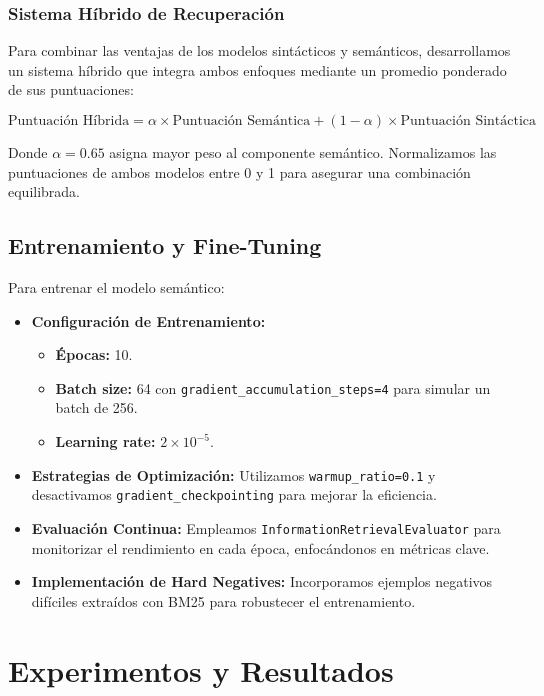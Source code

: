 \documentclass[11pt,english]{article}
\theoremstyle{plain}
\begin{document}
\subsubsection{Sistema Híbrido de Recuperación}

Para combinar las ventajas de los modelos sintácticos y semánticos, desarrollamos un sistema híbrido que integra ambos enfoques mediante un promedio ponderado de sus puntuaciones:

\[
\text{Puntuación Híbrida} = \alpha \times \text{Puntuación Semántica} + (1 - \alpha) \times \text{Puntuación Sintáctica}
\]

\noindent Donde $\alpha = 0.65$ asigna mayor peso al componente semántico. Normalizamos las puntuaciones de ambos modelos entre 0 y 1 para asegurar una combinación equilibrada.

\subsection{Entrenamiento y Fine-Tuning}

Para entrenar el modelo semántico:

\begin{itemize}
    \item \textbf{Configuración de Entrenamiento:}
    \begin{itemize}
        \item \textbf{Épocas:} 10.
        \item \textbf{Batch size:} 64 con \texttt{gradient\_accumulation\_steps=4} para simular un batch de 256.
        \item \textbf{Learning rate:} $2 \times 10^{-5}$.
    \end{itemize}

    \item \textbf{Estrategias de Optimización:} Utilizamos \texttt{warmup\_ratio=0.1} y desactivamos \texttt{gradient\_checkpointing} para mejorar la eficiencia.

    \item \textbf{Evaluación Continua:} Empleamos \texttt{InformationRetrievalEvaluator} para monitorizar el rendimiento en cada época, enfocándonos en métricas clave.

    \item \textbf{Implementación de Hard Negatives:} Incorporamos ejemplos negativos difíciles extraídos con BM25 para robustecer el entrenamiento.
\end{itemize}

\section{Experimentos y Resultados}
\end{document}
